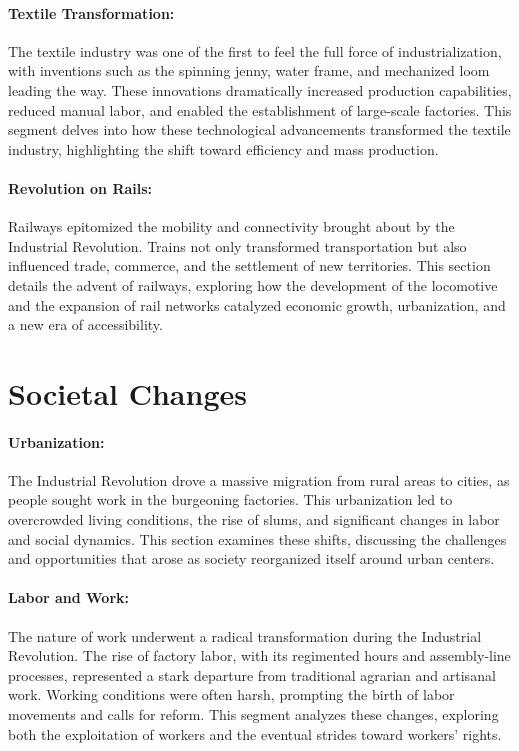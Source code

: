 \documentclass[a4paper,12pt]{book}
\begin{document}
\paragraph{Textile Transformation:}
The textile industry was one of the first to feel the full force of industrialization, with inventions such as the spinning jenny, water frame, and mechanized loom leading the way. These innovations dramatically increased production capabilities, reduced manual labor, and enabled the establishment of large-scale factories. This segment delves into how these technological advancements transformed the textile industry, highlighting the shift toward efficiency and mass production.

\paragraph{Revolution on Rails:}
Railways epitomized the mobility and connectivity brought about by the Industrial Revolution. Trains not only transformed transportation but also influenced trade, commerce, and the settlement of new territories. This section details the advent of railways, exploring how the development of the locomotive and the expansion of rail networks catalyzed economic growth, urbanization, and a new era of accessibility.

\section*{Societal Changes}

\paragraph{Urbanization:}
The Industrial Revolution drove a massive migration from rural areas to cities, as people sought work in the burgeoning factories. This urbanization led to overcrowded living conditions, the rise of slums, and significant changes in labor and social dynamics. This section examines these shifts, discussing the challenges and opportunities that arose as society reorganized itself around urban centers.

\paragraph{Labor and Work:}
The nature of work underwent a radical transformation during the Industrial Revolution. The rise of factory labor, with its regimented hours and assembly-line processes, represented a stark departure from traditional agrarian and artisanal work. Working conditions were often harsh, prompting the birth of labor movements and calls for reform. This segment analyzes these changes, exploring both the exploitation of workers and the eventual strides toward workers’ rights.
\end{document}

